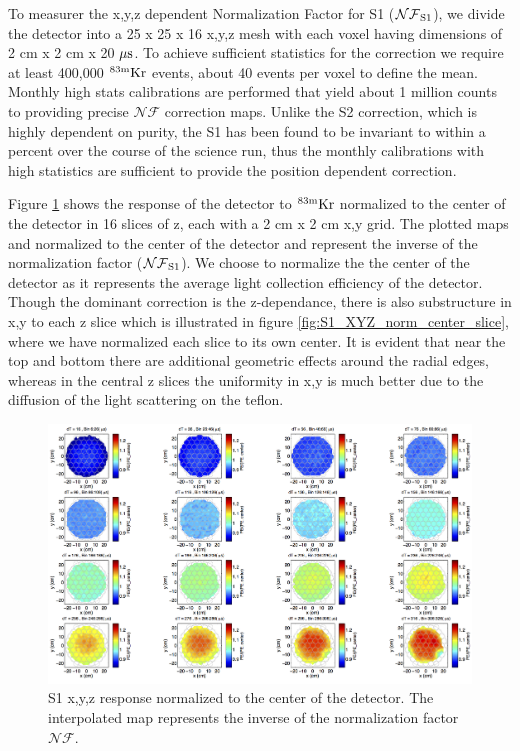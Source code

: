 To measurer the x,y,z dependent Normalization Factor for S1 ($\rm \mathcal{NF}_{S1}$), we divide the detector into a 25 x 25 x 16 x,y,z mesh with each voxel having dimensions of 2 cm x 2 cm x 20 $\rm \mu s$. To achieve sufficient statistics for the correction we require at least 400,000 $\rm^{83m}Kr$ events, about 40 events per voxel to define the mean. Monthly high stats calibrations are performed that yield about 1 million counts to providing precise $\mathcal{NF}$ correction maps. Unlike the S2 correction, which is highly dependent on purity, the S1 has been found to be invariant to within a percent over the course of the science run, thus the monthly calibrations with high statistics are sufficient to provide the position dependent correction.

Figure \ref{fig:S1_XYZ_norm_center} shows the response of the detector to $\rm^{83m}Kr$ normalized to the center of the detector in 16 slices of z, each with a 2 cm x 2 cm x,y grid. The plotted maps and normalized to the center of the detector and represent the inverse of the normalization factor ($\rm \mathcal{NF}_{S1}$). We choose to normalize the the center of the detector as it represents the average light collection efficiency of the detector. Though the dominant correction is the z-dependance, there is also substructure in x,y to each z slice which is illustrated in figure \ref{fig:S1_XYZ_norm_center_slice}, where we have normalized each slice to its own center. It is evident that near the top and bottom there are additional geometric effects around the radial edges, whereas in the central z slices the uniformity in x,y is much better due to the diffusion of the light scattering on the teflon.

\renewcommand{\baselinestretch}{1}
\small\normalsize
\begin{figure}\centering
\includegraphics[width=230mm]{Chapter_XYZ_Corr/Thesis_Corr_Plots/S1_XYZ_Kr_norm_center_crop_80.png}
\caption{S1 x,y,z response normalized to the center of the detector. The interpolated map represents the inverse of the normalization factor $\mathcal{NF}$. }
\label{fig:S1_XYZ_norm_center}
\end{figure}
\renewcommand{\baselinestretch}{2}
\small\normalsize

